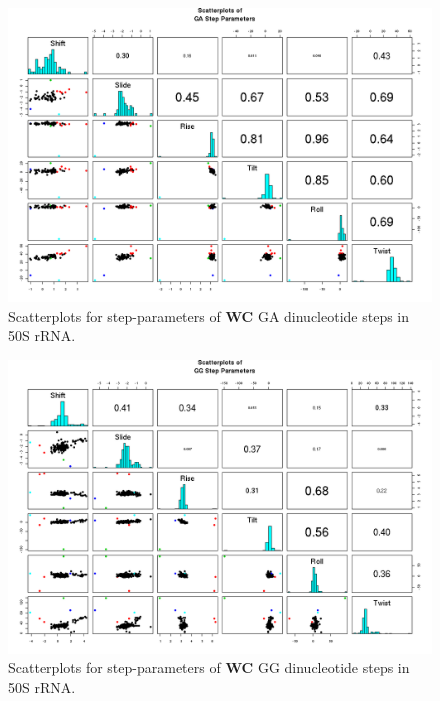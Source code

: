 \begin{figure}[H]
\centering
\includegraphics[angle=90, scale=0.6]{WC/GA.png}
\caption{Scatterplots for step-parameters of \textbf{WC} GA dinucleotide steps
in 50S rRNA.}
\label{fig:stepsGA}
\end{figure}

\begin{figure}[H]
\centering
\includegraphics[angle=90, scale=0.6]{WC/GG.png}
\caption{Scatterplots for step-parameters of \textbf{WC} GG dinucleotide steps
in 50S rRNA.}
\label{fig:stepsGG}
\end{figure}

